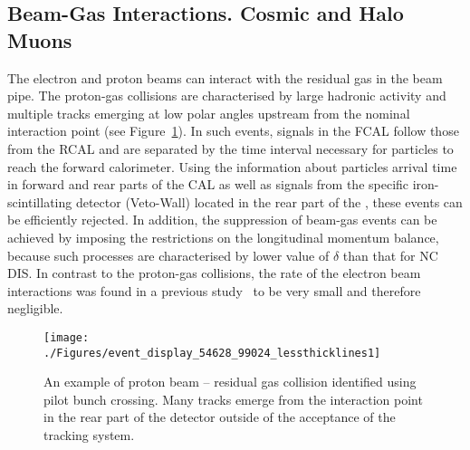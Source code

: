 \subsection{Beam-Gas Interactions. Cosmic and Halo Muons}
\label{subsec:beamgasfeatures}
The electron and proton beams can interact with the residual gas in the beam pipe. The proton-gas collisions are characterised by large hadronic activity and multiple tracks emerging at low polar angles upstream from the nominal interaction point (see Figure~\ref{fig:beamgaseventdisplay}). In such events, signals in the FCAL follow those from the RCAL and are separated by the time interval necessary for particles to reach the forward calorimeter. Using the information about particles arrival time in forward and rear parts of the CAL as well as signals from the specific iron-scintillating detector (Veto-Wall) located in the rear part of the \zeus, these events can be efficiently rejected. In addition, the suppression of beam-gas events can be achieved by imposing the restrictions on the longitudinal momentum balance, because such processes are characterised by lower value of $\delta$ than that for NC DIS. In contrast to the proton-gas collisions, the rate of the electron beam interactions was found in a previous study~\cite{thesis:moritz:2001} to be very small and therefore negligible.

\begin{figure}[ht]
	\centering
	\texttt{[image: ./Figures/event\_display\_54628\_99024\_lessthicklines1]} 
	\caption{An example of proton beam -- residual gas collision identified using pilot bunch crossing. Many tracks emerge from the interaction point in the rear part of the \zeus detector outside of the acceptance of the tracking system.}
	\label{fig:beamgaseventdisplay}
\end{figure}

